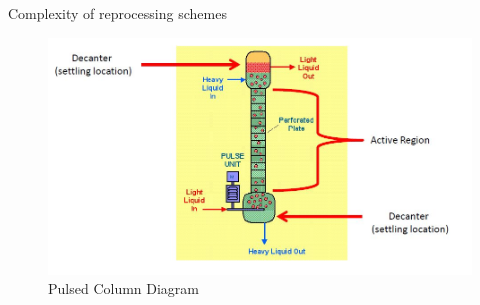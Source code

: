 \documentclass{beamer}
\begin{document}
\begin{frame}{Complexity of reprocessing schemes}
  \begin{figure}[H]
    \vspace*{-1cm}
    \begin{center}
      \includegraphics[scale = 0.4]{column}
      \caption{\tiny{Pulsed Column Diagram}}
    \end{center}
  \end{figure}
\end{frame}
\end{document}
